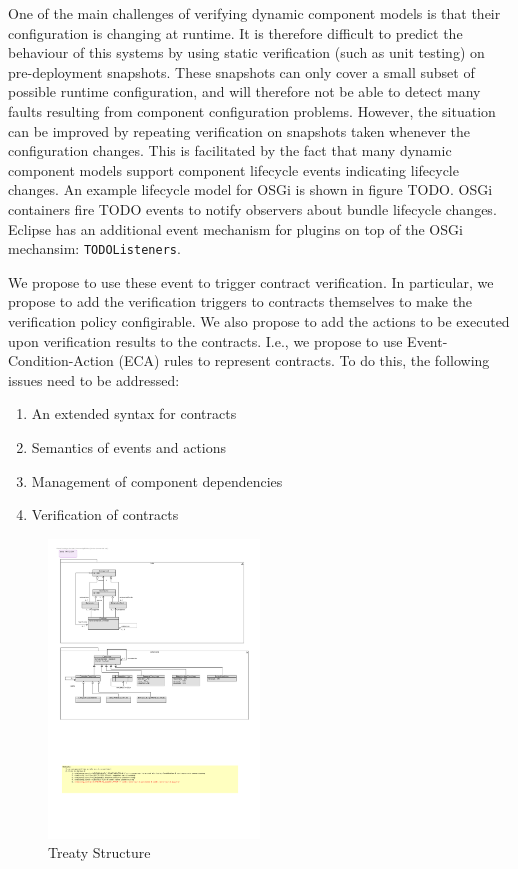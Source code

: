 \documentclass{llncs}
\begin{document}
One of the main challenges of verifying dynamic component models is that their configuration is changing at runtime. It is therefore difficult to predict the behaviour of this systems by using static verification (such as unit testing) on pre-deployment snapshots. These snapshots can only cover a small subset of possible runtime configuration, and will therefore not be able to detect many faults resulting from component configuration problems. However, the situation can 
be improved by repeating verification on snapshots taken whenever the configuration changes. This is facilitated by the fact that many dynamic component models support component lifecycle  events indicating lifecycle changes. 
An example lifecycle model for OSGi is shown in figure TODO. OSGi containers fire TODO events to notify observers about bundle lifecycle changes. Eclipse has an additional event mechanism for plugins on top of the OSGi mechansim: \texttt{TODOListeners}.  

We propose to use these event to trigger contract verification. In particular, we propose to add the verification triggers to contracts themselves to make the verification policy configirable. We also propose to add the actions to be executed 
upon verification results to the contracts. I.e., we propose to use Event-Condition-Action (ECA) rules to represent contracts. To do this, the following issues need to be addressed:

\begin{enumerate}
\item An extended syntax for contracts
\item Semantics of events and actions
\item Management of component dependencies
\item Verification of contracts 
\end{enumerate}



 

\begin{figure}[t]
\centering
\includegraphics[width=0.5\textwidth]{RoleModel1.pdf}
\caption{Treaty Structure}
\label{fig1}
\end{figure}
\end{document}
